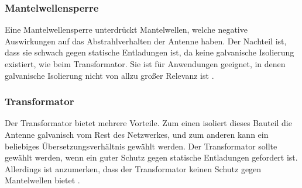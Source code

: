 \subsubsection{Mantelwellensperre}
Eine Mantelwellensperre unterdrückt Mantelwellen, welche negative Auswirkungen auf das Abstrahlverhalten der Antenne haben. Der Nachteil ist, dass sie schwach gegen statische Entladungen ist, da keine galvanische Isolierung existiert, wie beim Transformator. Sie ist für Anwendungen geeignet, in denen galvanische Isolierung nicht von allzu großer Relevanz ist \cite{balun}.

\subsubsection{Transformator}
Der Transformator bietet mehrere Vorteile. Zum einen isoliert dieses Bauteil die Antenne galvanisch vom Rest des Netzwerkes, und zum anderen kann ein beliebiges Übersetzungsverhältnis gewählt werden. Der Transformator sollte gewählt werden, wenn ein guter Schutz gegen statische Entladungen gefordert ist. Allerdings ist anzumerken, dass der Transformator keinen Schutz gegen Mantelwellen bietet \cite{balun}.

